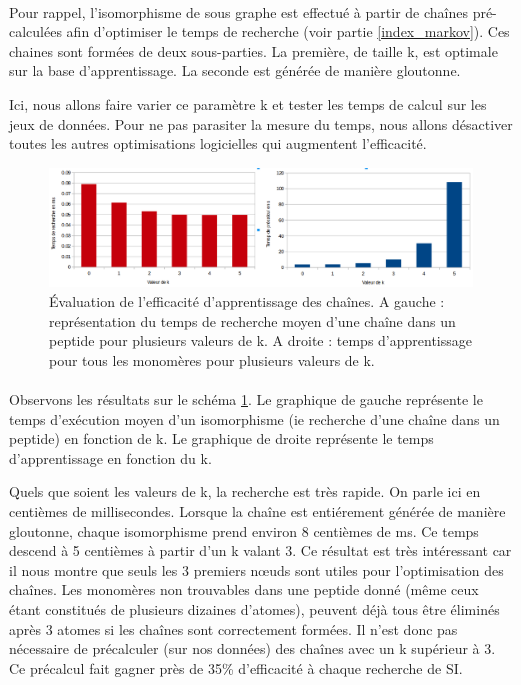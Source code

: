 \documentclass[12pt,french,twoside]{report}
\begin{document}
\paragraph{}Pour rappel, l'isomorphisme de sous graphe est effectué à partir de chaînes pré-calculées afin d'optimiser le temps de recherche (voir partie \ref{index_markov}).
Ces chaines sont formées de deux sous-parties.
La première, de taille k, est optimale sur la base d'apprentissage.
La seconde est générée de manière gloutonne.

Ici, nous allons faire varier ce paramètre k et tester les temps de calcul sur les jeux de données.
Pour ne pas parasiter la mesure du temps, nous allons désactiver toutes les autres optimisations logicielles qui augmentent l'efficacité.

\begin{figure}[!ht]
  \begin{center}
    \includegraphics[width=450px]{Figures/s2m/results/k.png}
    \caption{\label{k_graph}Évaluation de l'efficacité d'apprentissage des chaînes.
    A gauche : représentation du temps de recherche moyen d'une chaîne dans un peptide pour plusieurs valeurs de k.
    A droite : temps d'apprentissage pour tous les monomères pour plusieurs valeurs de k.}
  \end{center}
\end{figure}

\paragraph{}Observons les résultats sur le schéma \ref{k_graph}.
Le graphique de gauche représente le temps d'exécution moyen d'un isomorphisme (ie recherche d'une chaîne dans un peptide) en fonction de k.
Le graphique de droite représente le temps d'apprentissage en fonction du k.

Quels que soient les valeurs de k, la recherche est très rapide.
On parle ici en centièmes de millisecondes.
Lorsque la chaîne est entiérement générée de manière gloutonne, chaque isomorphisme prend environ 8 centièmes de ms.
Ce temps descend à 5 centièmes à partir d'un k valant 3.
Ce résultat est très intéressant car il nous montre que seuls les 3 premiers n\oe{}uds sont utiles pour l'optimisation des chaînes.
Les monomères non trouvables dans une peptide donné (même ceux étant constitués de plusieurs dizaines d'atomes), peuvent déjà tous être éliminés après 3 atomes si les chaînes sont correctement formées.
Il n'est donc pas nécessaire de précalculer (sur nos données) des chaînes avec un k supérieur à 3.
Ce précalcul fait gagner près de 35\% d'efficacité à chaque recherche de SI.
\end{document}
